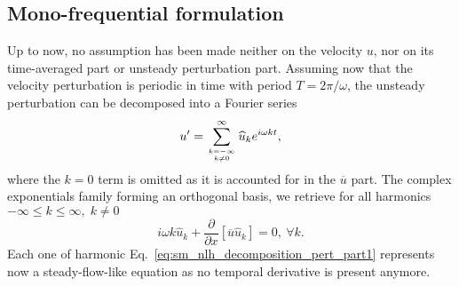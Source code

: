\subsection{Mono-frequential formulation}
Up to now, no assumption has been made neither on the velocity $u$,
nor on its time-averaged part or unsteady perturbation part.
Assuming now that the velocity perturbation 
is periodic in time with period
$T=2 \pi / \omega$,
the unsteady perturbation can be decomposed into 
a Fourier series
\begin{equation}
	u^\prime = \sum_{\genfrac{}{}{0pt}{}{k=-\infty}{k \neq 0}}^{\infty} 
	\widehat{u}_k e^{i \omega k t},
	\label{eq:sm_nlh_decomposition_pert}
\end{equation}
where the $k=0$ term is omitted as it is accounted for in
the $\overline{u}$ part.
The complex exponentials family forming
an orthogonal basis, we retrieve for all harmonics 
$-\infty \leq k \leq \infty, \; k \neq 0$
\begin{equation}
	i \omega k \widehat{u}_k + 
	\frac{\partial}{\partial x} \left[ \overline{u} \widehat{u}_k\right] =
	0,~\forall k.
	\label{eq:sm_nlh_decomposition_pert_part1}
\end{equation}
Each one of harmonic Eq.~\eqref{eq:sm_nlh_decomposition_pert_part1}
represents now a steady-flow-like equation as no temporal
derivative is present anymore.

